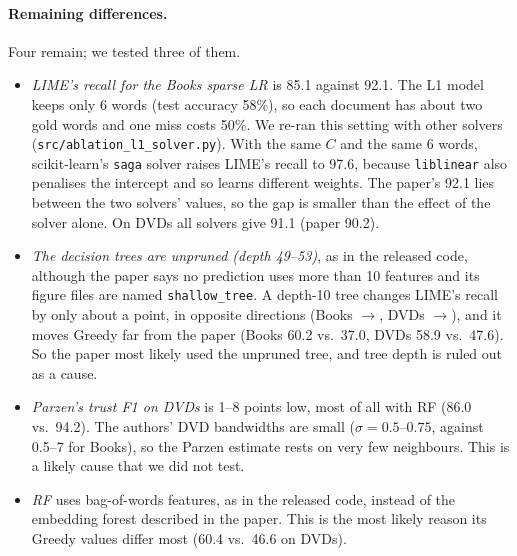 \paragraph{Remaining differences.} Four remain; we tested three of them.
\begin{itemize}\itemsep1pt
\item \emph{LIME's recall for the Books sparse LR} is 85.1 against 92.1. The L1 model keeps only 6 words (test accuracy 58\%), so each document has about two gold words and one miss costs 50\%. We re-ran this setting with other solvers (\texttt{src/ablation\_l1\_solver.py}). With the same $C$ and the same 6 words, scikit-learn's \texttt{saga} solver raises LIME's recall to 97.6, because \texttt{liblinear} also penalises the intercept and so learns different weights. The paper's 92.1 lies between the two solvers' values, so the gap is smaller than the effect of the solver alone. On DVDs all solvers give 91.1 (paper 90.2).
\item \emph{The decision trees are unpruned (depth 49--53)}, as in the released code, although the paper says no prediction uses more than 10 features and its figure files are named \texttt{shallow\_tree}. A depth-10 tree changes LIME's recall by only about a point, in opposite directions (Books \BooksDeepTreeLime{}$\rightarrow$\BooksShallowTreeLime{}, DVDs \DvdDeepTreeLime{}$\rightarrow$\DvdShallowTreeLime{}), and it moves Greedy far from the paper (Books 60.2 vs.\ 37.0, DVDs 58.9 vs.\ 47.6). So the paper most likely used the unpruned tree, and tree depth is ruled out as a cause.
\item \emph{Parzen's trust F1 on DVDs} is 1--8 points low, most of all with RF (86.0 vs.\ 94.2). The authors' DVD bandwidths are small ($\sigma{=}0.5$--$0.75$, against 0.5--7 for Books), so the Parzen estimate rests on very few neighbours. This is a likely cause that we did not test.
\item \emph{RF} uses bag-of-words features, as in the released code, instead of the embedding forest described in the paper. This is the most likely reason its Greedy values differ most (60.4 vs.\ 46.6 on DVDs).
\end{itemize}
